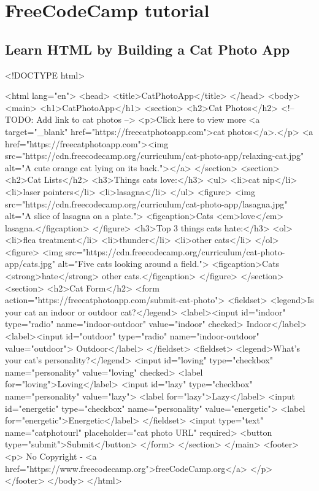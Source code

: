 \section{FreeCodeCamp tutorial}
\subsection{Learn HTML by Building a Cat Photo App}
\begin{html}
  <!DOCTYPE html>

  <html lang="en">
    <head>
      <title>CatPhotoApp</title>
    </head>
    <body>
      <main>
        <h1>CatPhotoApp</h1>
        <section>
          <h2>Cat Photos</h2>
          <!-- TODO: Add link to cat photos -->
          <p>Click here to view more <a target="_blank" href="https://freecatphotoapp.com">cat photos</a>.</p>
          <a href="https://freecatphotoapp.com"><img src="https://cdn.freecodecamp.org/curriculum/cat-photo-app/relaxing-cat.jpg" alt="A cute orange cat lying on its back."></a>
        </section>
        <section>
          <h2>Cat Lists</h2>
          <h3>Things cats love:</h3>
          <ul>
            <li>cat nip</li>
            <li>laser pointers</li>
            <li>lasagna</li>
          </ul>
          <figure>
            <img src="https://cdn.freecodecamp.org/curriculum/cat-photo-app/lasagna.jpg" alt="A slice of lasagna on a plate.">
            <figcaption>Cats <em>love</em> lasagna.</figcaption>  
          </figure>
          <h3>Top 3 things cats hate:</h3>
          <ol>
            <li>flea treatment</li>
            <li>thunder</li>
            <li>other cats</li>
          </ol>
          <figure>
            <img src="https://cdn.freecodecamp.org/curriculum/cat-photo-app/cats.jpg" alt="Five cats looking around a field.">
            <figcaption>Cats <strong>hate</strong> other cats.</figcaption>  
          </figure>
        </section>
        <section>
          <h2>Cat Form</h2>
          <form action="https://freecatphotoapp.com/submit-cat-photo">
            <fieldset>
              <legend>Is your cat an indoor or outdoor cat?</legend>
              <label><input id="indoor" type="radio" name="indoor-outdoor" value="indoor" checked> Indoor</label>
              <label><input id="outdoor" type="radio" name="indoor-outdoor" value="outdoor"> Outdoor</label>
            </fieldset>
            <fieldset>
              <legend>What's your cat's personality?</legend>
              <input id="loving" type="checkbox" name="personality" value="loving" checked> <label for="loving">Loving</label>
              <input id="lazy" type="checkbox" name="personality" value="lazy"> <label for="lazy">Lazy</label>
              <input id="energetic" type="checkbox" name="personality" value="energetic"> <label for="energetic">Energetic</label>
            </fieldset>
            <input type="text" name="catphotourl" placeholder="cat photo URL" required>
            <button type="submit">Submit</button>
          </form>
        </section>
      </main>
      <footer>
        <p>
          No Copyright - <a href="https://www.freecodecamp.org">freeCodeCamp.org</a>
        </p>
      </footer>
    </body>
  </html>
\end{html}

